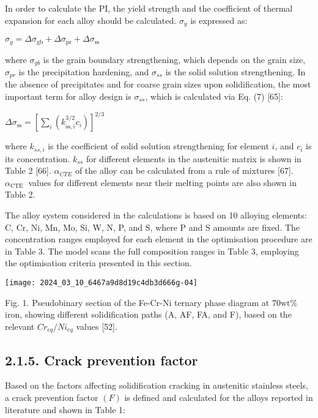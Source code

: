 \documentclass[10pt]{article}
\begin{document}
In order to calculate the PI, the yield strength and the coefficient of thermal expansion for each alloy should be calculated. $\sigma_{y}$ is expressed as:

$\sigma_{y}=\Delta \sigma_{\mathrm{gb}}+\Delta \sigma_{\mathrm{pr}}+\Delta \sigma_{\mathrm{ss}}$

where $\sigma_{g b}$ is the grain boundary strengthening, which depends on the grain size, $\sigma_{p r}$ is the precipitation hardening, and $\sigma_{s s}$ is the solid solution strengthening. In the absence of precipitates and for coarse grain sizes upon solidification, the most important term for alloy design is $\sigma_{s s}$, which is calculated via Eq. (7) [65]:

$\Delta \sigma_{\mathrm{ss}}=\left[\sum_{i}\left(k_{\mathrm{ss}, i}^{3 / 2} c_{i}\right)\right]^{2 / 3}$

where $k_{s s, i}$ is the coefficient of solid solution strengthening for element $i$, and $c_{i}$ is its concentration. $k_{s s}$ for different elements in the austenitic matrix is shown in Table 2 [66]. $\alpha_{C T E}$ of the alloy can be calculated from a rule of mixtures [67]. $\alpha_{\text {CTE }}$ values for different elements near their melting points are also shown in Table 2.

The alloy system considered in the calculations is based on 10 alloying elements: C, Cr, Ni, Mn, Mo, Si, W, N, P, and S, where P and S amounts are fixed. The concentration ranges employed for each element in the optimisation procedure are in Table 3. The model scans the full composition ranges in Table 3, employing the optimisation criteria presented in this section.

\begin{center}
\texttt{[image: 2024\_03\_10\_6467a9d8d19c4db3d666g-04]}
\end{center}

Fig. 1. Pseudobinary section of the Fe-Cr-Ni ternary phase diagram at $70 \mathrm{wt} \%$ iron, showing different solidification paths (A, AF, FA, and F), based on the relevant $C r_{e q} / N i_{e q}$ values [52].

\subsection*{2.1.5. Crack prevention factor}
Based on the factors affecting solidification cracking in austenitic stainless steels, a crack prevention factor $(F)$ is defined and calculated for the alloys reported in literature and shown in Table 1:
\end{document}
